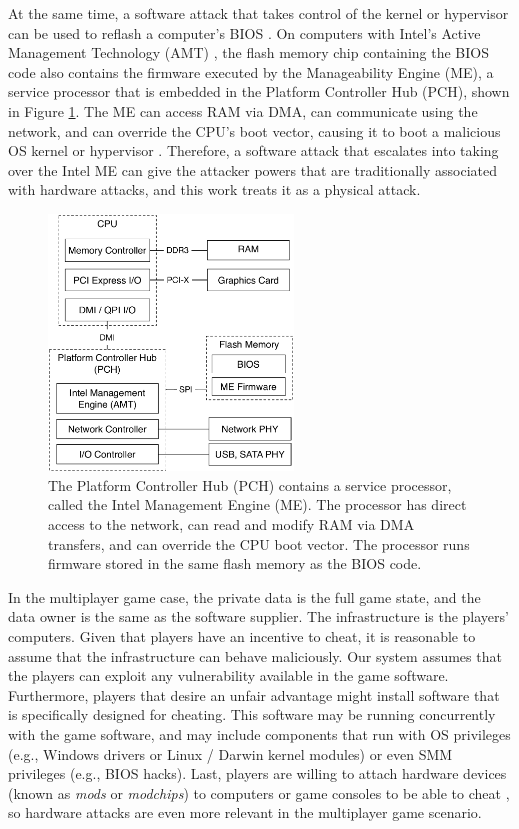 At the same time, a software attack that takes control of the kernel or
hypervisor can be used to reflash a computer's BIOS \cite{wojtczuk2010bios}. On
computers with Intel's Active Management Technology (AMT) \cite{intel2013amt},
the flash memory chip containing the BIOS code also contains the firmware
executed by the Manageability Engine (ME), a service processor that is embedded
in the Platform Controller Hub (PCH), shown in Figure \ref{fig:pch}. The ME can
access RAM via DMA, can communicate using the network, and can override the
CPU's boot vector, causing it to boot a malicious OS kernel or hypervisor
\cite{tereshkin2009amt}. Therefore, a software attack that escalates into
taking over the Intel ME can give the attacker powers that are traditionally
associated with hardware attacks, and this work treats it as a physical attack.

\begin{figure}[hbtp]
  \centering
  \includegraphics[width=65mm]{figures/pch.pdf}
  \caption{
    The Platform Controller Hub (PCH) contains a service processor, called the
    Intel Management Engine (ME). The processor has direct access to the
    network, can read and modify RAM via DMA transfers, and can override the
    CPU boot vector. The processor runs firmware stored in the same flash
    memory as the BIOS code.
  }
  \label{fig:pch}
\end{figure}

In the multiplayer game case, the private data is the full game state, and the
data owner is the same as the software supplier. The infrastructure is the
players' computers. Given that players have an incentive to cheat, it is
reasonable to assume that the infrastructure can behave maliciously. Our system
assumes that the players can exploit any vulnerability available in the game
software. Furthermore, players that desire an unfair advantage might install
software that is specifically designed for cheating. This software may be
running concurrently with the game software, and may include components that
run with OS privileges (e.g., Windows drivers or Linux / Darwin kernel
modules) or even SMM privileges (e.g., BIOS hacks). Last, players are willing
to attach hardware devices (known as \textit{mods} or \textit{modchips}) to
computers or game consoles to be able to cheat \cite{harris2007mod}, so
hardware attacks are even more relevant in the multiplayer game scenario.


